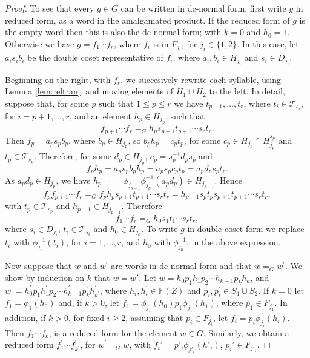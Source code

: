 \documentclass[a4paper,12pt]{article}
\numberwithin{equation}{section}
\numberwithin{figure}{section}
\newcommand{\FF}{\ensuremath{\mathbb{F}}}
\newcommand{\cT}{\mathcal{T}}
\begin{document}
\begin{proof}
To see that every $g\in G$ can be written in dc-normal form, first
write $g$ in reduced form,
as a word in the amalgamated product. If the reduced form of $g$ is the empty
word then this is also the dc-normal form; with $k=0$ and $h_0=1$. 
Otherwise we have $g=f_1\cdots f_r$, where $f_i$ is in $F_{j_i}$, for
$j_i\in \{1,2\}$. 
In this case, let $a_is_ib_i$
be the double coset representative of $f_i$, where 
$a_i,b_i\in H_{j_i}$ and $s_i\in D_{j_i}$. 

Beginning on the right, with $f_r$, we succesively 
rewrite each syllable, using Lemma \ref{lem:reltran}, and moving
elements of $H_1\cup H_2$ to the left. 
In detail, suppose that, for some $p$ such that  $1\le p\le r$ we 
have $t_{p+1},\ldots ,t_r$, where $t_i\in \cT_{s_i}$, for $i=p+1,\ldots,
r$, and an element $h_p\in H_{j_p}$, such that 
\[f_{p+1}\cdots f_r=_G h_ps_{p+1}t_{p+1}\cdots s_rt_r.\]
Then $f_p=a_ps_pb_p$, where $b_p\in H_{j_p}$, so $b_ph_p=c_pt_p$, 
for some $c_p\in H_{j_p}\cap H_{j_p}^{s_p}$ 
and $t_p\in \cT_{s_p}$. Therefore, for some $d_p\in H_{j_p}$, 
$c_p=s_p^{-1}d_ps_p$ and  
\[f_p h_p=a_p s_p b_p h_p=a_ps_pc_pt_p=a_p d_ps_pt_p.\]
As $a_pd_p\in H_{j_p}$, we have $h_{p-1}=
\phi_{j_{p-1}}\phi_{j_p}^{-1}(a_p d_p)\in H_{j_{p-1}}$. 
Hence 
\[f_pf_{p+1}\cdots f_r=_G f_ph_ps_{p+1}t_{p+1}\cdots s_rt_r
=h_{p-1}s_pt_ps_{p+1}t_{p+1}\cdots s_rt_r,\]
with $t_p\in \cT_{s_p}$ and $h_{p-1}\in H_{j_{p-1}}$. Therefore  
\[f_1\cdots f_r=_G h_0s_1t_1\cdots s_rt_r,\]
 where $s_i\in D_{j_i}$, $t_i\in \cT_{s_i}$ and $h_0\in H_{j_0}$. 
To write $g$ in double coset form we replace $t_i$ 
with $\phi_{j_i}^{-1}(t_i)$, 
for $i=1,\ldots, r$, and $h_0$ with $\phi_{j_0}^{-1}$, in the above
expression. 


Now suppose that $w$ and $w^\prime$ are words in dc-normal form and that
$w=_G w^\prime$. We show by induction on $k$ that $w=w'$. 
Let $w=h_{0}p_1h_{1}p_2 \cdots h_{k-1}p_kh_{{k}}$,
and $w^\prime =h_{0}^\prime p_1^\prime h_{1}^\prime  p_2^\prime
\cdots h_{k-1}^\prime p_k^\prime h_{{k^\prime}}^\prime$, where
$h_i, h_i^\prime\in \FF(Z)$ and $p_i,p_i^\prime\in S_1\cup S_2$.
If $k=0$ let $f_1=\phi_1(h_0)$ and, if $k>0$, 
let $f_1=\phi_{j_1}(h_0)p_1\phi_{j_1}(h_1)$, where $p_1\in F_{j_1}$. 
 In addition, if $k>0$,  
 for fixed $i\ge 2$, assuming that $p_i\in F_{j_i}$, 
let $f_i=p_i\phi_{j_i}(h_i)$.
 Then $f_1\cdots f_k$, is
a reduced form for the element $w\in G$. Similarly, we obtain a reduced
form $f_1^\prime \cdots f_{k^\prime}^\prime$, for $w^\prime=_G w$, 
with
$f_i'=p'_i\phi_{j'_i}(h'_i)$, $p_i'\in F_{j'_i}$. 


\end{proof}
\end{document}
